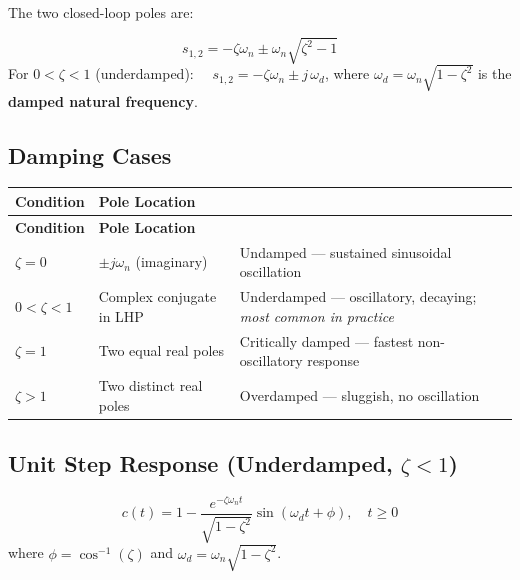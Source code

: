 \documentclass[12pt,a4paper]{article}
\begin{document}
The two closed-loop poles are:
\begin{tcolorbox}[formulabox]
$$s_{1,2} = -\zeta\omega_n \pm \omega_n\sqrt{\zeta^2 - 1}$$
For $0 < \zeta < 1$ (underdamped): $\quad s_{1,2} = -\zeta\omega_n \pm j\,\omega_d$, \quad where $\omega_d = \omega_n\sqrt{1-\zeta^2}$ is the \textbf{damped natural frequency}.
\end{tcolorbox}

\subsection{Damping Cases}

\begingroup
\setlength{\LTleft}{0pt}
\setlength{\LTright}{0pt}
\begin{longtable}{|>{\centering\arraybackslash}p{2.2cm}|>{\centering\arraybackslash}p{2.4cm}|>{\small\raggedright\arraybackslash}m{\dimexpr(\linewidth-2.2cm-2.4cm-6\tabcolsep-4\arrayrulewidth)/1\relax}|}
\hline
\textbf{\color{myteal}Condition} & \textbf{\color{myteal}Pole Location} & \multicolumn{1}{c|}{\textbf{\color{myteal}Response}} \\
\hline
\endfirsthead
\hline
\textbf{\color{myteal}Condition} & \textbf{\color{myteal}Pole Location} & \multicolumn{1}{c|}{\textbf{\color{myteal}Response}} \\
\hline
\endhead
$\zeta = 0$ & $\pm j\omega_n$ (imaginary) & Undamped — sustained sinusoidal oscillation \\
\hline
$0 < \zeta < 1$ & Complex conjugate in LHP & Underdamped — oscillatory, decaying; \textit{most common in practice} \\
\hline
$\zeta = 1$ & Two equal real poles & Critically damped — fastest non-oscillatory response \\
\hline
$\zeta > 1$ & Two distinct real poles & Overdamped — sluggish, no oscillation \\
\hline
\end{longtable}
\endgroup

\subsection{Unit Step Response (Underdamped, \texorpdfstring{$\zeta < 1$}{zeta < 1})}

\begin{tcolorbox}[formulabox, title={Step Response Formula}]
$$c(t) = 1 - \frac{e^{-\zeta\omega_n t}}{\sqrt{1-\zeta^2}}\sin\!\left(\omega_d t + \phi\right), \quad t \geq 0$$
where $\phi = \cos^{-1}(\zeta)$ and $\omega_d = \omega_n\sqrt{1-\zeta^2}$.
\end{tcolorbox}
\end{document}
